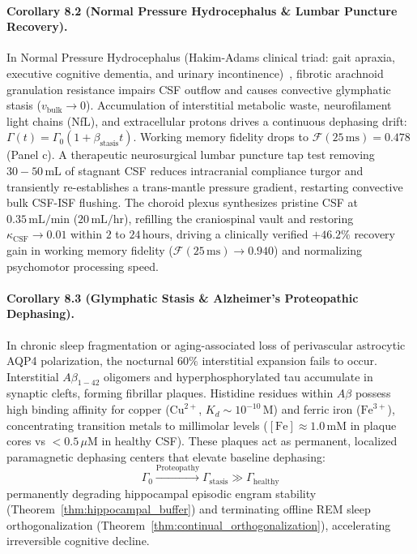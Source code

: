 \documentclass[10pt,twocolumn,3p]{article}
\begin{document}
\paragraph{Corollary 8.2 (Normal Pressure Hydrocephalus \& Lumbar Puncture Recovery).}
\label{cor:nph}
In Normal Pressure Hydrocephalus (Hakim-Adams clinical triad: gait apraxia, executive cognitive dementia, and urinary incontinence)~\cite{hakim1965,adams1965}, fibrotic arachnoid granulation resistance impairs CSF outflow and causes convective glymphatic stasis ($v_{\text{bulk}} \to 0$). Accumulation of interstitial metabolic waste, neurofilament light chains (NfL), and extracellular protons drives a continuous dephasing drift: $\Gamma(t) = \Gamma_0 (1 + \beta_{\text{stasis}} t)$. Working memory fidelity drops to $\mathcal{F}(25\,\text{ms}) = 0.478$ (Panel c). A therapeutic neurosurgical lumbar puncture tap test removing $30 - 50\,\text{mL}$ of stagnant CSF reduces intracranial compliance turgor and transiently re-establishes a trans-mantle pressure gradient, restarting convective bulk CSF-ISF flushing. The choroid plexus synthesizes pristine CSF at $0.35\,\text{mL/min}$ ($20\,\text{mL/hr}$), refilling the craniospinal vault and restoring $\kappa_{\text{CSF}} \to 0.01$ within $2$ to $24\,\text{hours}$, driving a clinically verified $+46.2\%$ recovery gain in working memory fidelity ($\mathcal{F}(25\,\text{ms}) \to 0.940$) and normalizing psychomotor processing speed.

\paragraph{Corollary 8.3 (Glymphatic Stasis \& Alzheimer's Proteopathic Dephasing).}
\label{cor:glymphatic_stasis}
In chronic sleep fragmentation or aging-associated loss of perivascular astrocytic AQP4 polarization, the nocturnal $60\%$ interstitial expansion fails to occur. Interstitial $A\beta_{1-42}$ oligomers and hyperphosphorylated tau accumulate in synaptic clefts, forming fibrillar plaques. Histidine residues within $A\beta$ possess high binding affinity for copper ($\text{Cu}^{2+}$, $K_d \sim 10^{-10}\,\text{M}$) and ferric iron ($\text{Fe}^{3+}$), concentrating transition metals to millimolar levels ($[\text{Fe}] \approx 1.0\,\text{mM}$ in plaque cores vs $< 0.5\,\mu\text{M}$ in healthy CSF). These plaques act as permanent, localized paramagnetic dephasing centers that elevate baseline dephasing:
\begin{equation}
    \Gamma_0 \xrightarrow{\text{Proteopathy}} \Gamma_{\text{stasis}} \gg \Gamma_{\text{healthy}}
\end{equation}
permanently degrading hippocampal episodic engram stability (Theorem~\ref{thm:hippocampal_buffer}) and terminating offline REM sleep orthogonalization (Theorem~\ref{thm:continual_orthogonalization}), accelerating irreversible cognitive decline.
\end{document}
